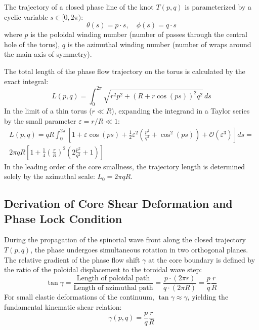 \documentclass[12pt,a4paper]{article}
\begin{document}
	The trajectory of a closed phase line of the knot $T(p,q)$ is parameterized by a cyclic variable $s \in [0, 2\pi)$:
	\begin{equation}
		\theta(s) = p \cdot s, \quad \phi(s) = q \cdot s
	\end{equation}
	where $p$ is the poloidal winding number (number of passes through the central hole of the torus), $q$ is the azimuthal winding number (number of wraps around the main axis of symmetry). 
	
	The total length of the phase flow trajectory on the torus is calculated by the exact integral:
	\begin{equation}
		L(p,q) = \int_0^{2\pi} \sqrt{r^2 p^2 + (R + r \cos(ps))^2 q^2} \, ds
	\end{equation}
	In the limit of a thin torus ($r \ll R$), expanding the integrand in a Taylor series by the small parameter $\varepsilon = r/R \ll 1$:
	\begin{equation}
		\begin{split}
			L(p,q) = q R \int_0^{2\pi} \left[ 1 + \varepsilon \cos(ps) + \frac{1}{2} \varepsilon^2 \left( \frac{p^2}{q^2} + \cos^2(ps) \right) + \mathcal{O}(\varepsilon^3) \right] ds = \\
			2\pi q R \left[ 1 + \frac{1}{4} \left(\frac{r}{R}\right)^2 \left( 2\frac{p^2}{q^2} + 1 \right) \right]
		\end{split}
	\end{equation}
	In the leading order of the core smallness, the trajectory length is determined solely by the azimuthal scale: $L_0 = 2\pi q R$.
	
	\subsection{Derivation of Core Shear Deformation and Phase Lock Condition}
	During the propagation of the spinorial wave front along the closed trajectory $T(p,q)$, the phase undergoes simultaneous rotation in two orthogonal planes. 
	The relative gradient of the phase flow shift $\gamma$ at the core boundary is defined by the ratio of the poloidal displacement to the toroidal wave step:
	\begin{equation}
		\tan\gamma = \frac{\text{Length of poloidal path}}{\text{Length of azimuthal path}} = \frac{p \cdot (2\pi r)}{q \cdot (2\pi R)} = \frac{p}{q} \frac{r}{R}
	\end{equation}
	For small elastic deformations of the continuum, $\tan\gamma \approx \gamma$, yielding the fundamental kinematic shear relation:
	\begin{equation}
		\gamma(p,q) = \frac{p}{q} \frac{r}{R}
	\end{equation}
	
\end{document}
